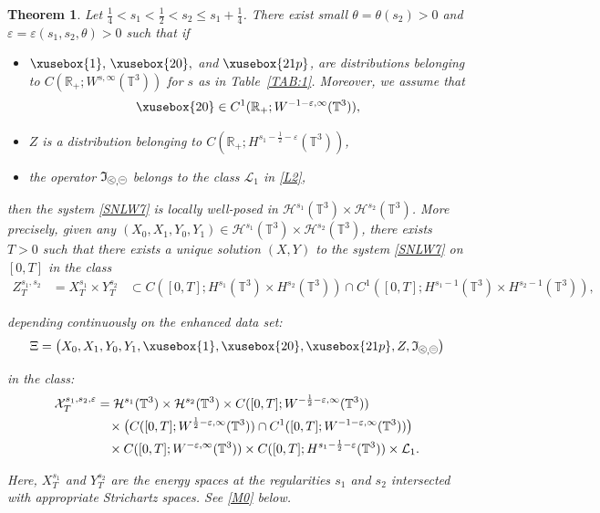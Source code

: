 \documentclass[%
11pt,  reqno]{amsart}
\def\<#1>{\xusebox{#1}}
\newcommand{\pe}{\mathbin{\scaleobj{0.7}{\tikz \draw (0,0) node[shape=circle,draw,inner sep=0pt,minimum size=8.5pt] {\scriptsize  $=$};}}}
\newcommand{\pl}{\mathbin{\scaleobj{0.7}{\tikz \draw (0,0) node[shape=circle,draw,inner sep=0pt,minimum size=8.5pt] {\scriptsize $<$};}}}
\newtheorem{theorem}{Theorem} [section]
\newcommand{\1}{\hspace{0.2mm}\text{I}\hspace{0.2mm}}
\newcommand{\noi}{\noindent}
\newcommand{\R}{\mathbb{R}}
\newcommand{\T}{\mathbb{T}}
\renewcommand{\L}{\mathcal{L}}
\newcommand{\eps}{\varepsilon}
\newcommand{\ta}{\theta}
\renewcommand{\H}{\mathcal{H}}
\newcommand{\If}{\mathfrak{I}}
\numberwithin{equation}{section}
\numberwithin{theorem}{section}
\begin{document}
\begin{theorem}\label{THM:1}
Let $\frac 14 < s_1 < \frac 12 < s_2  \leq   s_1 +\tfrac 14$.
There exist small $\ta = \ta(s_2) > 0$
and 
$\eps = \eps(s_1, s_2, \ta) > 0$
such that 
if 
\begin{itemize}
\item   $\<1>, \, \<20>,$ and $\<21p>$,  are distributions
belonging
to 
$C(\R_+; W^{s, \infty}(\T^3))$
for $s$ as in Table~\ref{TAB:1}.
Moreover, we assume that 
\[ \<20>\in   C^1(\R_+;W^{-1 -\eps,\infty}(\T^3)),\]


\item 
$Z$ is a distribution 
belonging to $C(\R_+; H^{s_1 - \frac{1}{2}-\eps}(\T^3))$, 

\smallskip

\item 
 the operator 
 $\If_{\pl, \pe}$
belongs to  the class 
 $\L_1$ in \eqref{L2}, 

\end{itemize}

\noi
then
the system \eqref{SNLW7} is locally well-posed
in $\H^{s_1}(\T^3)\times \H^{s_2}(\T^3)$.
More precisely, 
given any $(X_0, X_1, Y_0, Y_1) \in \H^{s_1}(\T^3)\times \H^{s_2}(\T^3)$, 
there exists $T > 0$ 
such that there exists  a unique solution $(X, Y) $ to the system \eqref{SNLW7} on $[0, T]$
in the class 
\begin{align*}
 Z^{s_1, s_2}_T 
 & =  X^{s_1}_T\times  Y^{s_2}_T
 & \subset 
C([0, T];H^{s_1}(\T^3)\times H^{s_2}(\T^3))
\cap C^1([0, T]; H^{s_1-1}(\T^3)\times H^{s_2-1}(\T^3)), 
\end{align*}


\noi
depending  continuously 
on the enhanced data set:
\begin{align}
\Xi = \big(X_0, X_1, Y_0, Y_1, \<1>, \<20>,  \<21p>, Z, 
 \If_{\pl, \pe}\big)
\label{data1}
\end{align}

\noi
in the class:
\begin{align}
\begin{split}
\mathcal{X}^{s_1, s_2, \eps}_T
& = \H^{s_1}(\T^3) \times 
\H^{s_2}(\T^3)
\times 
C([0,T]; W^{-\frac 12 - \eps, \infty}(\T^3))\\
& \hphantom{X}
\times 
\big(C([0,T]; W^{\frac 12 - \eps, \infty}(\T^3))
\cap C^1([0,T];W^{-1 -\eps,\infty}(\T^3))\big)\\
& \hphantom{X}
\times
C([0,T]; W^{ - \eps, \infty}(\T^3))
 \times 
C([0, T]; H^{s_1 - \frac{1}{2}-\eps}(\T^3))
\times 
 \L_1.
\end{split}
\label{L3}
\end{align}

\noi
Here, 
$X^{s_1}_T$ and $Y^{s_2}_T$ are 
the energy spaces at the regularities $s_1$ and $s_2$
intersected with appropriate Strichartz spaces.
See \eqref{M0}  below.



\end{theorem} 
\end{document}
